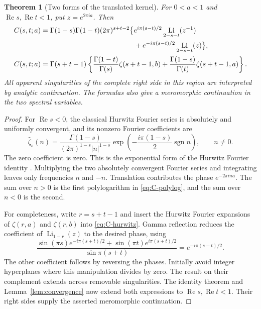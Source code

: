 \documentclass[11pt]{article}
\numberwithin{equation}{section}
\newtheorem{theorem}{Theorem}[section]
\theoremstyle{definition}
\theoremstyle{remark}
\DeclareMathOperator{\Li}{Li}
\DeclareMathOperator{\Rea}{Re}
\begin{document}
\begin{theorem}[Two forms of the translated kernel]
\label{thm:kernel}
For $0<a<1$ and $\Rea s,\Rea t<1$, put $z=e^{2\pi ia}$.
Then
\begin{align}
 C(s,t;a)={}&\Gamma(1-s)\Gamma(1-t)(2\pi)^{s+t-2}
 \bigl\{e^{i\pi(s-t)/2}\Li_{2-s-t}(z^{-1})\notag\\
 &\hspace{42mm}+e^{-i\pi(s-t)/2}\Li_{2-s-t}(z)\bigr\},
 \label{eq:C-polylog}\\
 C(s,t;a)={}&\Gamma(s+t-1)
 \left\{\frac{\Gamma(1-t)}{\Gamma(s)}\zeta(s+t-1,b)
       +\frac{\Gamma(1-s)}{\Gamma(t)}\zeta(s+t-1,a)\right\}.
 \label{eq:C-hurwitz}
\end{align}
All apparent singularities of the complete right side in this region
are interpreted by analytic continuation. The formulas also give a
meromorphic continuation in the two spectral variables.
\end{theorem}
\begin{proof}
For $\Rea s<0$, the classical Hurwitz Fourier series is absolutely and
uniformly convergent, and its nonzero Fourier coefficients are
\begin{equation}
 \widehat\zeta_s(n)=
 \frac{\Gamma(1-s)}{(2\pi)^{1-s}|n|^{1-s}}
 \exp\!\left(-\frac{i\pi(1-s)}2\operatorname{sgn}n\right),
 \qquad n\ne0.
 \label{eq:fourier-coefficients}
\end{equation}
The zero coefficient is zero. This is the exponential form of the
Hurwitz Fourier identity \cite[Eq.~25.11.9]{dlmf-hurwitz}.
Multiplying the two absolutely convergent Fourier series and integrating
leaves only frequencies $n$ and $-n$. Translation contributes the phase
$e^{-2\pi ina}$. The sum over $n>0$ is the first polylogarithm in
\eqref{eq:C-polylog}, and the sum over $n<0$ is the second.

For completeness, write $r=s+t-1$ and insert the Hurwitz Fourier
expansions of $\zeta(r,a)$ and $\zeta(r,b)$ into
\eqref{eq:C-hurwitz}. Gamma reflection reduces the coefficient of
$\Li_{1-r}(z)$ to the desired phase, using
\[
 \frac{\sin(\pi s)e^{-i\pi(s+t)/2}
       +\sin(\pi t)e^{i\pi(s+t)/2}}{\sin\pi(s+t)}
 =e^{-i\pi(s-t)/2}.
\]
The other coefficient follows by reversing the phases. Initially avoid
integer hyperplanes where this manipulation divides by zero. The
result on their complement extends across removable singularities.
The identity theorem and Lemma~\ref{lem:convergence} now extend both
expressions to $\Rea s,\Rea t<1$. Their right sides supply the asserted
meromorphic continuation.
\end{proof}
\end{document}
